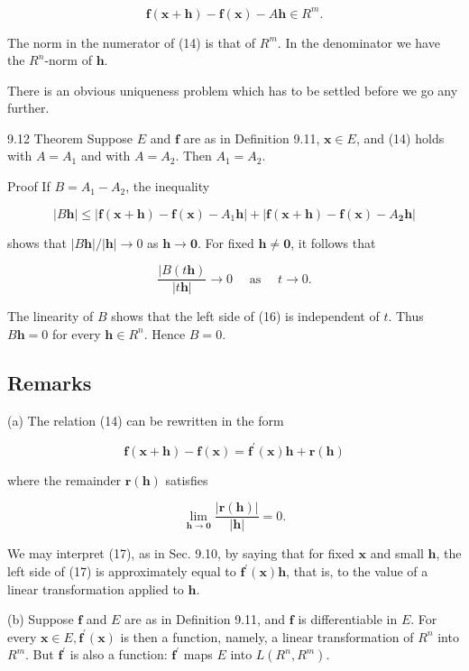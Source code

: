 \documentclass[10pt]{article}
\begin{document}
$$
\mathbf{f}(\mathbf{x}+\mathbf{h})-\mathbf{f}(\mathbf{x})-A \mathbf{h} \in R^{m} .
$$

The norm in the numerator of (14) is that of $R^{m}$. In the denominator we have the $R^{n}$-norm of $\mathbf{h}$.

There is an obvious uniqueness problem which has to be settled before we go any further.

9.12 Theorem Suppose $E$ and $\mathbf{f}$ are as in Definition 9.11, $\mathbf{x} \in E$, and (14) holds with $A=A_{1}$ and with $A=A_{2}$. Then $A_{1}=A_{2}$.

Proof If $B=A_{1}-A_{2}$, the inequality

$$
|B \mathbf{h}| \leq\left|\mathbf{f}(\mathbf{x}+\mathbf{h})-\mathbf{f}(\mathbf{x})-A_{1} \mathbf{h}\right|+\left|\mathbf{f}(\mathbf{x}+\mathbf{h})-\mathbf{f}(\mathbf{x})-A_{\mathbf{2}} \mathbf{h}\right|
$$

shows that $|B \mathbf{h}| /|\mathbf{h}| \rightarrow 0$ as $\mathbf{h} \rightarrow \mathbf{0}$. For fixed $\mathbf{h} \neq \mathbf{0}$, it follows that

$$
\frac{\mid B(t \mathbf{h})}{|t \mathbf{h}|} \rightarrow 0 \quad \text { as } \quad t \rightarrow 0 .
$$

The linearity of $B$ shows that the left side of (16) is independent of $t$. Thus $B \mathbf{h}=0$ for every $\mathbf{h} \in R^{n}$. Hence $B=0$.

\subsection{Remarks}
(a) The relation (14) can be rewritten in the form

$$
\mathbf{f}(\mathbf{x}+\mathbf{h})-\mathbf{f}(\mathbf{x})=\mathbf{f}^{\prime}(\mathbf{x}) \mathbf{h}+\mathbf{r}(\mathbf{h})
$$

where the remainder $\mathbf{r}(\mathbf{h})$ satisfies

$$
\lim _{\mathbf{h} \rightarrow \mathbf{0}} \frac{|\mathbf{r}(\mathbf{h})|}{|\mathbf{h}|}=0 .
$$

We may interpret (17), as in Sec. 9.10, by saying that for fixed $\mathbf{x}$ and small $\mathbf{h}$, the left side of (17) is approximately equal to $\mathbf{f}^{\prime}(\mathbf{x}) \mathbf{h}$, that is, to the value of a linear transformation applied to $\mathbf{h}$.

(b) Suppose $\mathbf{f}$ and $E$ are as in Definition 9.11, and $\mathbf{f}$ is differentiable in $E$. For every $\mathbf{x} \in E, \mathbf{f}^{\prime}(\mathbf{x})$ is then a function, namely, a linear transformation of $R^{n}$ into $R^{m}$. But $\mathbf{f}^{\prime}$ is also a function: $\mathbf{f}^{\prime}$ maps $E$ into $L\left(R^{n}, R^{m}\right)$.
\end{document}

